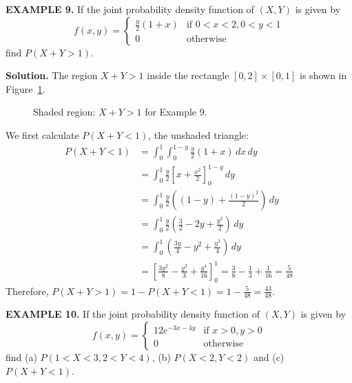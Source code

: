 \documentclass{article}
\begin{document}
\vspace{1em}

\textbf{EXAMPLE 9.} If the joint probability density function of $(X,Y)$ is given by
$$
f(x, y) = \begin{cases} \frac{y}{2}(1+x) & \text{if } 0 < x < 2, 0 < y < 1 \\ 0 & \text{otherwise} \end{cases}
$$
find $P(X +Y > 1)$.

\textbf{Solution.} The region $X+Y>1$ inside the rectangle $[0,2]\times[0,1]$ is shown in Figure~\ref{fig:ex9}.
\begin{figure}[H]
\centering
{}
\caption{Shaded region: $X+Y>1$ for Example 9.}
\label{fig:ex9}
\end{figure}
We first calculate $P(X+Y < 1)$, the unshaded triangle:
\begin{align*}
P(X+Y < 1) &= \int_{0}^{1} \int_{0}^{1-y} \frac{y}{2}(1+x) \,dx \,dy \\
&= \int_{0}^{1} \frac{y}{2} \left[ x + \frac{x^2}{2} \right]_{0}^{1-y} \,dy \\
&= \int_{0}^{1} \frac{y}{2} \left( (1-y) + \frac{(1-y)^2}{2} \right) \,dy \\
&= \int_{0}^{1} \frac{y}{2} \left( \frac{3}{2} - 2y + \frac{y^2}{2} \right) \,dy \\
&= \int_{0}^{1} \left( \frac{3y}{4} - y^2 + \frac{y^3}{4} \right) \,dy \\
&= \left[ \frac{3y^2}{8} - \frac{y^3}{3} + \frac{y^4}{16} \right]_{0}^{1} = \frac{3}{8} - \frac{1}{3} + \frac{1}{16} = \frac{5}{48}
\end{align*}
Therefore, $P(X+Y > 1) = 1 - P(X+Y < 1) = 1 - \frac{5}{48} = \frac{43}{48}$.

\vspace{1em}

\textbf{EXAMPLE 10.} If the joint probability density function of $(X,Y)$ is given by
$$
f(x, y) = \begin{cases} 12e^{-3x-4y} & \text{if } x > 0, y > 0 \\ 0 & \text{otherwise} \end{cases}
$$
find (a) $P(1 < X < 3, 2 < Y < 4)$, (b) $P(X < 2, Y < 2)$ and (c) $P(X +Y < 1)$.
\end{document}
